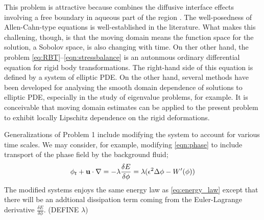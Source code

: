 This problem is attractive because combines the diffusive interface
effects involving a free boundary in aqueous part of the region \cite{}.
The well-posedness of Allen-Cahn-type equations is well-established in the
literature.  What makes this challening, though, is that
the moving domain means the function space for the solution,
a Sobolov space, is also changing with time.
On ther other hand, the problem \eqref{eq:RBT}--\eqref{eqn:stressbalance}
is an autonmous ordinary differential equation for rigid body transformations.
The right-hand side of this equation is defined by a system of elliptic
PDE.  On the other hand, several methods have been developed for
analysing the smooth domain dependence of solutions to elliptic PDE,
especially in the study of eigenvalue problems, for example.
It is conceivable that moving domain estimates can be applied to the
present problem to exhibit locally Lipschitz dependence on
the rigid deformations. 

Generalizations of Problem 1 include modifying the 
system to account for various time scales.
We may consider, for example, modifying \eqref{eqn:phase}
to include transport of the phase field by the background fluid;
\begin{equation*}
\phi_t + \mathbf{u} \cdot \nabla = -\lambda \frac{\delta E}{\delta \phi} = \lambda(\epsilon^2 \Delta \phi - W'(\phi))
\end{equation*}
The modified systems enjoys the same energy law as \eqref{eq:energy_law} 
except that there will be an addtional dissipation term coming from the
Euler-Lagrange derivative $\frac{\delta E}{\delta \phi}$.
(DEFINE $\lambda$)

